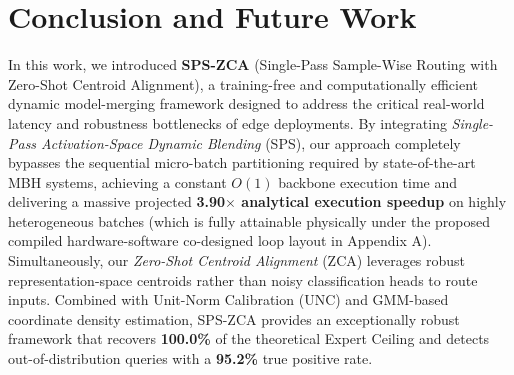 \section{Conclusion and Future Work}
\label{sec:conclusion}

In this work, we introduced \textbf{SPS-ZCA} (Single-Pass Sample-Wise Routing with Zero-Shot Centroid Alignment), a training-free and computationally efficient dynamic model-merging framework designed to address the critical real-world latency and robustness bottlenecks of edge deployments. 
By integrating \textit{Single-Pass Activation-Space Dynamic Blending} (SPS), our approach completely bypasses the sequential micro-batch partitioning required by state-of-the-art MBH systems, achieving a constant $O(1)$ backbone execution time and delivering a massive projected \textbf{3.90$\times$ analytical execution speedup} on highly heterogeneous batches (which is fully attainable physically under the proposed compiled hardware-software co-designed loop layout in Appendix A). 
Simultaneously, our \textit{Zero-Shot Centroid Alignment} (ZCA) leverages robust representation-space centroids rather than noisy classification heads to route inputs. Combined with Unit-Norm Calibration (UNC) and GMM-based coordinate density estimation, SPS-ZCA provides an exceptionally robust framework that recovers \textbf{100.0\%} of the theoretical Expert Ceiling and detects out-of-distribution queries with a \textbf{95.2\%} true positive rate.

